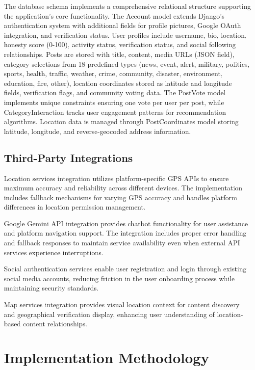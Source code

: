 The database schema implements a comprehensive relational structure supporting the application's core functionality. The Account model extends Django's authentication system with additional fields for profile pictures, Google OAuth integration, and verification status. User profiles include username, bio, location, honesty score (0-100), activity status, verification status, and social following relationships. Posts are stored with title, content, media URLs (JSON field), category selections from 18 predefined types (news, event, alert, military, politics, sports, health, traffic, weather, crime, community, disaster, environment, education, fire, other), location coordinates stored as latitude and longitude fields, verification flags, and community voting data. The PostVote model implements unique constraints ensuring one vote per user per post, while CategoryInteraction tracks user engagement patterns for recommendation algorithms. Location data is managed through PostCoordinates model storing latitude, longitude, and reverse-geocoded address information.

\subsection{Third-Party Integrations}
\label{subsec:third-party}

Location services integration utilizes platform-specific GPS APIs to ensure maximum accuracy and reliability across different devices. The implementation includes fallback mechanisms for varying GPS accuracy and handles platform differences in location permission management.

Google Gemini API integration provides chatbot functionality for user assistance and platform navigation support. The integration includes proper error handling and fallback responses to maintain service availability even when external API services experience interruptions.

Social authentication services enable user registration and login through existing social media accounts, reducing friction in the user onboarding process while maintaining security standards.

Map services integration provides visual location context for content discovery and geographical verification display, enhancing user understanding of location-based content relationships.

\section{Implementation Methodology}
\label{sec:implementation}


